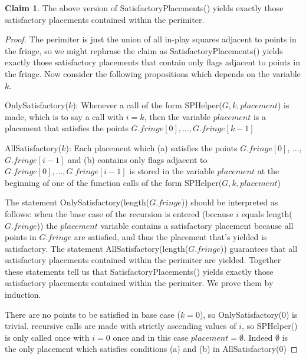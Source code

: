 \documentclass{article}
\theoremstyle{definition}
\theoremstyle{definition}
\theoremstyle{theorem}
\newtheorem{claim}{Claim}
\begin{document}
	\begin{claim}
		The above version of SatisfactoryPlacements() yields exactly those satisfactory placements contained within the perimiter.
	\end{claim}
	\begin{proof}
		The perimiter is just the union of all in-play squares adjacent to points in the fringe, so we might rephrase the claim as SatisfactoryPlacements() yields exactly those satisfactory placements that contain only flags adjacent to points in the fringe. Now consider the following propositions which depends on the variable $k$.
		
		\bigskip
		OnlySatisfactory($k$): Whenever a call of the form SPHelper($G,k,placement$) is made, which is to say a call with $i = k$, then the variable $placement$ is a placement that satisfies the points $G.fringe[0],...,G.fringe[k-1]$
	
		\bigskip
		 AllSatisfactory($k$): Each placement which (a) satisfies the points $G.fringe[0]$, ...,$G.fringe[i-1]$ and (b) contains only flags adjacent to $G.fringe[0], ..., G.fringe[i-1]$ is stored in the variable $placement$ at the beginning of one of the function calls of the form SPHelper($G,k,placement$)
		 
		 \bigskip
		 The statement OnlySatisfactory(length($G.fringe$)) should be interpreted as follows: when the base case of the recursion is entered (because $i$ equals length($G.fringe$)) the $placement$ variable contains a satisfactory placement because all points in $G.fringe$ are satisfied, and thus the placement that's yielded is satisfactory. The statement AllSatisfactory(length($G.fringe$)) guarantees  that all satisfactory placements contained within the perimiter are yielded. Together these statements tell us that SatisfactoryPlacements() yields exactly those satisfactory placements contained within the perimiter. We prove them by induction.
		 
		There are no points to be satisfied in base case ($k = 0$), so OnlySatisfactory(0) is trivial. recursive calls are made with strictly ascending values of $i$, so SPHelper() is only called once with $i = 0$ once and in this  case $placement = \emptyset$. Indeed $\emptyset$ is the only placement which satisfies conditions (a) and (b) in AllSatisfactory(0)
		

\end{proof}
\end{document}
